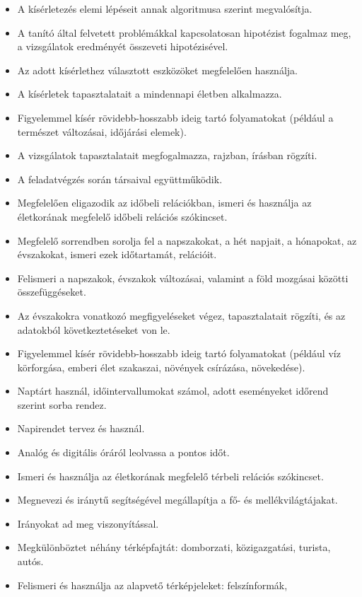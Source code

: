 \begin{itemize}
\item
  A kísérletezés elemi lépéseit annak algoritmusa szerint megvalósítja.
\item
  A tanító által felvetett problémákkal kapcsolatosan hipotézist
  fogalmaz meg, a vizsgálatok eredményét összeveti hipotézisével.
\item
  Az adott kísérlethez választott eszközöket megfelelően használja.
\item
  A kísérletek tapasztalatait a mindennapi életben alkalmazza.
\item
  Figyelemmel kísér rövidebb-hosszabb ideig tartó folyamatokat (például
  a természet változásai, időjárási elemek).
\item
  A vizsgálatok tapasztalatait megfogalmazza, rajzban, írásban rögzíti.
\item
  A feladatvégzés során társaival együttműködik.
\item
  Megfelelően eligazodik az időbeli relációkban, ismeri és használja az
  életkorának megfelelő időbeli relációs szókincset.
\item
  Megfelelő sorrendben sorolja fel a napszakokat, a hét napjait, a
  hónapokat, az évszakokat, ismeri ezek időtartamát, relációit.
\item
  Felismeri a napszakok, évszakok változásai, valamint a föld mozgásai
  közötti összefüggéseket.
\item
  Az évszakokra vonatkozó megfigyeléseket végez, tapasztalatait rögzíti,
  és az adatokból következtetéseket von le.
\item
  Figyelemmel kísér rövidebb-hosszabb ideig tartó folyamatokat (például
  víz körforgása, emberi élet szakaszai, növények csírázása,
  növekedése).
\item
  Naptárt használ, időintervallumokat számol, adott eseményeket időrend
  szerint sorba rendez.
\item
  Napirendet tervez és használ.
\item
  Analóg és digitális óráról leolvassa a pontos időt.
\item
  Ismeri és használja az életkorának megfelelő térbeli relációs
  szókincset.
\item
  Megnevezi és iránytű segítségével megállapítja a fő- és
  mellékvilágtájakat.
\item
  Irányokat ad meg viszonyítással.
\item
  Megkülönböztet néhány térképfajtát: domborzati, közigazgatási,
  turista, autós.
\item
  Felismeri és használja az alapvető térképjeleket: felszínformák,

\end{itemize}
